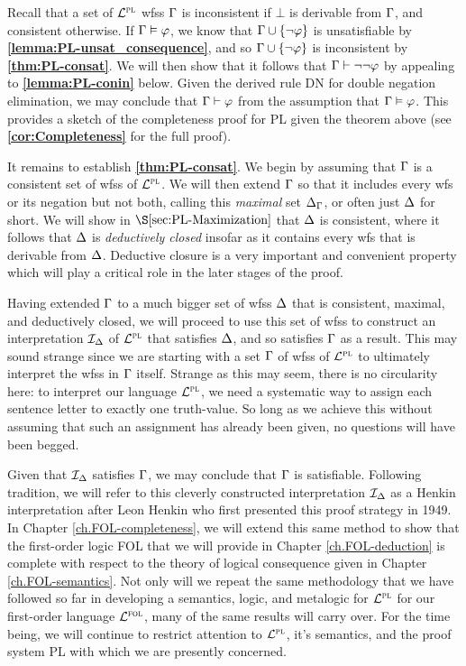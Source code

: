 Recall that a set of $\mathcal{L}^{\textsc{pl}}$ wfss $\Gamma$ is inconsistent if $\bot$ is derivable from $\Gamma$, and consistent otherwise.
If $\Gamma\vDash\varphi$, we know that $\Gamma\cup\lbrace\neg\varphi\rbrace$ is unsatisfiable by \textbf{\ref{lemma:PL-unsat_consequence}}, and so $\Gamma\cup\lbrace\neg\varphi\rbrace$ is inconsistent by \textbf{\ref{thm:PL-consat}}.
We will then show that it follows that $\Gamma \vdash \neg \neg \varphi$ by appealing to \textbf{\ref{lemma:PL-conin}} below. 
Given the derived rule DN for double negation elimination, we may conclude that $\Gamma\vdash\varphi$ from the assumption that $\Gamma\vDash\varphi$. 
This provides a sketch of the completeness proof for PL given the theorem above (see \textbf{\ref{cor:Completeness}} for the full proof).

It remains to establish \textbf{\ref{thm:PL-consat}}.
We begin by assuming that $\Gamma$ is a consistent set of wfss of $\mathcal{L}^{\textsc{pl}}$. 
We will then extend $\Gamma$ so that it includes every wfs or its negation but not both, calling this \textit{maximal} set $\Delta_{\Gamma}$, or often just $\Delta$ for short. 
We will show in $\S\ref{sec:PL-Maximization}$ that $\Delta$ is consistent, where it follows that $\Delta$ is \textit{deductively closed} insofar as it contains every wfs that is derivable from $\Delta$.
Deductive closure is a very important and convenient property which will play a critical role in the later stages of the proof.

Having extended $\Gamma$ to a much bigger set of wfss $\Delta$ that is consistent, maximal, and deductively closed, we will proceed to use this set of wfss to construct an interpretation $\mathcal{I}_{\Delta}$ of $\mathcal{L}^{\textsc{pl}}$ that satisfies $\Delta$, and so satisfies $\Gamma$ as a result. 
This may sound strange since we are starting with a set $\Gamma$ of wfss of $\mathcal{L}^{\textsc{pl}}$ to ultimately interpret the wfss in $\Gamma$ itself.
Strange as this may seem, there is no circularity here: to interpret our language $\mathcal{L}^{\textsc{pl}}$, we need a systematic way to assign each sentence letter to exactly one truth-value.
So long as we achieve this without assuming that such an assignment has already been given, no questions will have been begged.

Given that $\mathcal{I}_{\Delta}$ satisfies $\Gamma$, we may conclude that $\Gamma$ is satisfiable. 
Following tradition, we will refer to this cleverly constructed interpretation $\mathcal{I}_{\Delta}$ as a Henkin interpretation after Leon Henkin who first presented this proof strategy in 1949.
In Chapter \ref{ch.FOL-completeness}, we will extend this same method to show that the first-order logic FOL that we will provide in Chapter \ref{ch.FOL-deduction} is complete with respect to the theory of logical consequence given in Chapter \ref{ch.FOL-semantics}.
Not only will we repeat the same methodology that we have followed so far in developing a semantics, logic, and metalogic for $\mathcal{L}^{\textsc{pl}}$ for our first-order language $\mathcal{L}^{\textsc{fol}}$, many of the same results will carry over.
For the time being, we will continue to restrict attention to $\mathcal{L}^{\textsc{pl}}$, it's semantics, and the proof system PL with which we are presently concerned.

